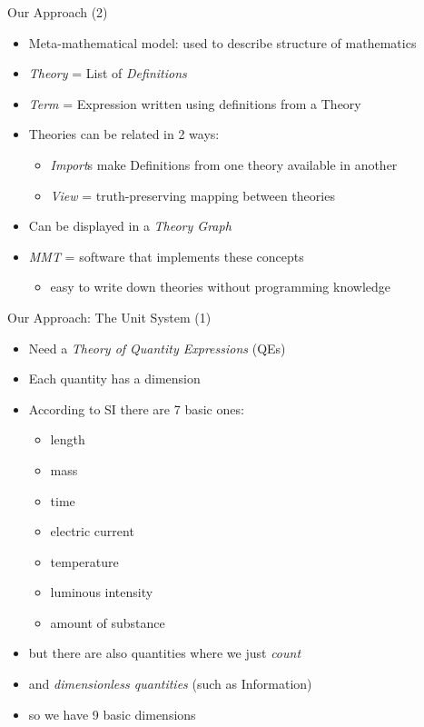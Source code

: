 \documentclass{beamer}
\begin{document}
  \begin{frame}{Our Approach (2)}
    \begin{itemize}[<+->]
      \item Meta-mathematical model: used to describe structure of mathematics

      \item \textit{Theory} = List of \textit{Definitions}

      \item \textit{Term} = Expression written using definitions from a Theory

      \item Theories can be related in 2 ways:
      \begin{itemize}
        \item \textit{Import}s make Definitions from one theory available in another
        \item \textit{View} = truth-preserving mapping between theories
      \end{itemize}

      \item Can be displayed in a \textit{Theory Graph}

      \item \textit{MMT} = software that implements these concepts
      \begin{itemize}
        \item easy to write down theories without programming knowledge
      \end{itemize}

    \end{itemize}
  \end{frame}
  \begin{frame}{Our Approach: The Unit System (1)}
    \begin{itemize}[<+->]
      \item Need a \textit{Theory of Quantity Expressions} (QEs)

      \item Each quantity has a dimension
      \item According to SI there are 7 basic ones:
      \begin{itemize}
        \item length
        \item mass
        \item time
        \item electric current
        \item temperature
        \item luminous intensity
        \item amount of substance
      \end{itemize}
      \item but there are also quantities where we just \textit{count}
      \item and \textit{dimensionless quantities} (such as Information)
      \item so we have 9 basic dimensions
    \end{itemize}
  \end{frame}
\end{document}
